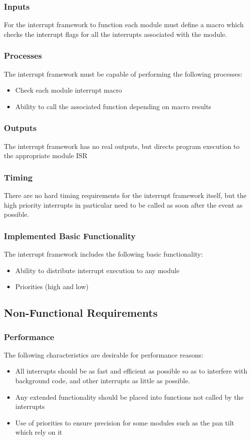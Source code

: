 \documentclass[]{report}
\begin{document}
\subsubsection{Inputs}
For the interrupt framework to function each module must define a macro which checks the interrupt flags for all the interrupts associated with the module.

\subsubsection{Processes}
The interrupt framework must be capable of performing the following processes:
\begin{itemize}
	\item Check each module interrupt macro
	\item Ability to call the associated function depending on macro results
\end{itemize}

\subsubsection{Outputs}
The interrupt framework has no real outputs, but directs program execution to the appropriate module ISR

\subsubsection{Timing}
There are no hard timing requirements for the interrupt framework itself, but the high priority interrupts in particular need to be called as soon after the event as possible.

\subsubsection{Implemented Basic Functionality}
The interrupt framework includes the following basic functionality:
\begin{itemize}
	\item Ability to distribute interrupt execution to any module
	\item Priorities (high and low)
\end{itemize}

\subsection{Non-Functional Requirements}
\subsubsection{Performance}
The following characteristics are desirable for performance reasons:
\begin{itemize}
	\item All interrupts should be as fast and efficient as possible so as to interfere with background code, and other interrupts as little as possible.
	\item Any extended functionality should be placed into functions not called by the interrupts
	\item Use of priorities to ensure precision for some modules such as the pan tilt which rely on it
\end{itemize}
\end{document}
